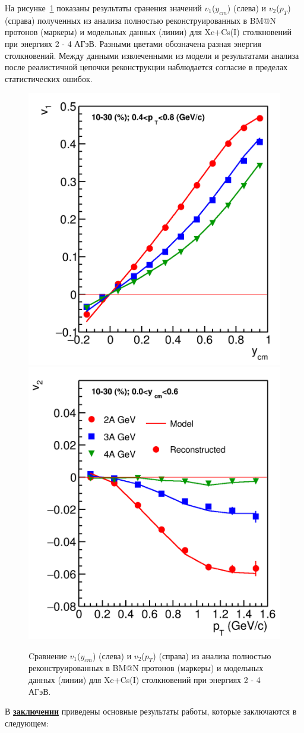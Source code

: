 На рисунке~\ref{fig:bmn_v1_v2} показаны результаты сранения значений  $v_1$($y_{cm}$) (слева) и $v_2$($p_{T}$) (справа) полученных  из анализа полностью реконструированных в BM@N протонов (маркеры) и 
модельных данных (линии) для Xe+Cs(I) столкновений при энергиях 2 - 4 АГэВ. 
Разными цветами обозначена разная энергия столкновений. 
Между данными извлеченными из модели и результатами анализа после реалистичной цепочки реконструкции наблюдается согласие в пределах статистических ошибок. 
%
\begin{figure}[h]
\begin{center}
\includegraphics[width=0.4\linewidth]{images/v1_proton_tof_rapidity.png}
\includegraphics[width=0.4\linewidth]{images/v2_proton_tof_pT.png}
\caption{Cравнение  $v_1$($y_{cm}$) (слева) и $v_2$($p_{T}$) (справа) из анализа полностью реконструированных в BM@N протонов (маркеры) и 
модельных данных (линии) для Xe+Cs(I) столкновений при энергиях 2 - 4 АГэВ. }
\label{fig:bmn_v1_v2}
\end{center}
\end{figure}

В \underline{\textbf{заключении}} приведены основные результаты работы, которые заключаются в следующем:



